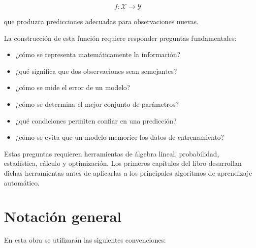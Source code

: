 \documentclass[
  spanish,
  11pt,
  letterpaper,
  DIV=11,
  numbers=noendperiod]{scrreprt}
\providecommand{\tightlist}{%
  \setlength{\itemsep}{0pt}\setlength{\parskip}{0pt}}
\theoremstyle{definition}
\theoremstyle{plain}
\theoremstyle{definition}
\theoremstyle{remark}
\begin{document}
\[
f:\mathcal{X}\longrightarrow\mathcal{Y}
\]

que produzca predicciones adecuadas para observaciones nuevas.

La construcción de esta función requiere responder preguntas
fundamentales:

\begin{itemize}
\tightlist
\item
  ¿cómo se representa matemáticamente la información?
\item
  ¿qué significa que dos observaciones sean semejantes?
\item
  ¿cómo se mide el error de un modelo?
\item
  ¿cómo se determina el mejor conjunto de parámetros?
\item
  ¿qué condiciones permiten confiar en una predicción?
\item
  ¿cómo se evita que un modelo memorice los datos de entrenamiento?
\end{itemize}

Estas preguntas requieren herramientas de álgebra lineal, probabilidad,
estadística, cálculo y optimización. Los primeros capítulos del libro
desarrollan dichas herramientas antes de aplicarlas a los principales
algoritmos de aprendizaje automático.


\chapter{Notación general}\label{notaciuxf3n-general}

En esta obra se utilizarán las siguientes convenciones:
\end{document}
